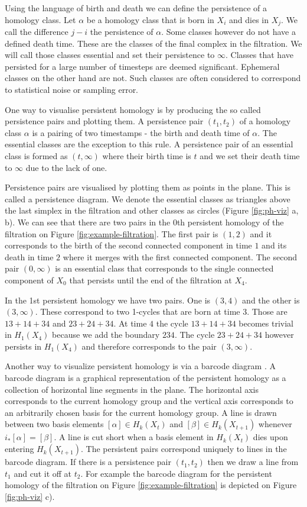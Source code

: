 Using the language of birth and death we can define the persistence of a homology class. Let $\alpha$ be a homology class that is born in $X_i$ and dies in $X_j$. We call the difference $j - i$ the persistence of $\alpha$. Some classes however do not have a defined death time. These are the classes of the final complex in the filtration. We will call those classes essential and set their persistence to $\infty$. Classes that have persisted for a large number of timesteps are deemed significant. Ephemeral classes on the other hand are not. Such classes are often considered to correspond to statistical noise or sampling error.

One way to visualise persistent homology is by producing the so called persistence pairs and plotting them. A persistence pair $(t_1, t_2)$ of a homology class $\alpha$ is a pairing of two timestamps - the birth and death time of $\alpha$. The essential classes are the exception to this rule. A persistence pair of an essential class is formed as $(t, \infty)$ where their birth time is $t$ and we set their death time to $\infty$ due to the lack of one.

Persistence pairs are visualised by plotting them as points in the plane. This is called a persistence diagram. We denote the essential classes as triangles above the last simplex in the filtration and other classes as circles (Figure \ref{fig:ph-viz} a, b). We can see that there are two pairs in the 0th persistent homology of the filtration on Figure \ref{fig:example-filtration}. The first pair is $(1, 2)$ and it corresponds to the birth of the second connected component in time $1$ and its death in time $2$ where it merges with the first connected component. The second pair $(0, \infty)$ is an essential class that corresponds to the single connected component of $X_0$ that persists until the end of the filtration at $X_4$.

In the 1st persistent homology we have two pairs. One is $(3, 4)$ and the other is $(3, \infty)$. These correspond to two 1-cycles that are born at time $3$. Those are $13 + 14 + 34$ and $23 + 24 + 34$. At time $4$ the cycle $13 + 14 + 34$ becomes trivial in $H_1(X_4)$ because we add the boundary $234$. The cycle $23 + 24 + 34$ however persists in $H_1(X_4)$ and therefore corresponds to the pair $(3, \infty)$.

Another way to visualize persistent homology is via a barcode diagram \cite{barcodes}. A barcode diagram is a graphical representation of the persistent homology as a collection of horizontal line segments in the plane. The horizontal axis corresponds to the current homology group and the vertical axis corresponds to an arbitrarily chosen basis for the current homology group. A line is drawn between two basis elements $[\alpha] \in H_k(X_t)$ and $[\beta] \in H_k(X_{t+1})$ whenever $i_*[\alpha] = [\beta]$. A line is cut short when a basis element in $H_k(X_t)$ dies upon entering $H_k(X_{t+1})$. The persistent pairs correspond uniquely to lines in the barcode diagram. If there is a persistence pair $(t_1, t_2)$ then we draw a line from $t_1$ and cut it off at $t_2$. For example the barcode diagram for the persistent homology of the filtration on Figure \ref{fig:example-filtration} is depicted on Figure \ref{fig:ph-viz} c).

